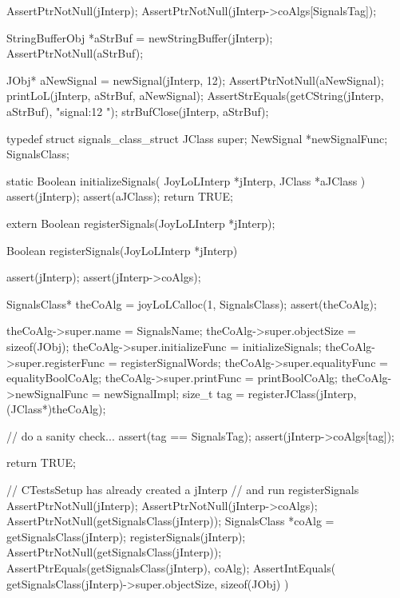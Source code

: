 \startCTest
  AssertPtrNotNull(jInterp);
  AssertPtrNotNull(jInterp->coAlgs[SignalsTag]);

  StringBufferObj *aStrBuf = newStringBuffer(jInterp);
  AssertPtrNotNull(aStrBuf);
  
  JObj* aNewSignal = newSignal(jInterp, 12);
  AssertPtrNotNull(aNewSignal);
  printLoL(jInterp, aStrBuf, aNewSignal);
  AssertStrEquals(getCString(jInterp, aStrBuf), "signal:12 ");
  strBufClose(jInterp, aStrBuf);
\stopCTest
\stopTestCase
\stopTestSuite

\startTestSuite[registerSignals]

\startCHeader
typedef struct signals_class_struct {
  JClass     super;
  NewSignal *newSignalFunc;
} SignalsClass;

\stopCHeader

\startCCode
static Boolean initializeSignals(
  JoyLoLInterp *jInterp,
  JClass       *aJClass
) {
  assert(jInterp);
  assert(aJClass);
  return TRUE;
}
\stopCCode

\startCHeader
extern Boolean registerSignals(JoyLoLInterp *jInterp);
\stopCHeader
{}

\startCCode
Boolean registerSignals(JoyLoLInterp *jInterp) {
  assert(jInterp);
  assert(jInterp->coAlgs);
  
  SignalsClass* theCoAlg
    = joyLoLCalloc(1, SignalsClass);
  assert(theCoAlg);
  
  theCoAlg->super.name           = SignalsName;
  theCoAlg->super.objectSize     = sizeof(JObj);
  theCoAlg->super.initializeFunc = initializeSignals;
  theCoAlg->super.registerFunc   = registerSignalWords;
  theCoAlg->super.equalityFunc   = equalityBoolCoAlg;
  theCoAlg->super.printFunc      = printBoolCoAlg;
  theCoAlg->newSignalFunc        = newSignalImpl;
  size_t tag =
    registerJClass(jInterp, (JClass*)theCoAlg);
  
  // do a sanity check...
  assert(tag == SignalsTag);
  assert(jInterp->coAlgs[tag]);
   
  return TRUE;
}
\stopCCode


\startCTest
  // CTestsSetup has already created a jInterp
  // and run registerSignals
  AssertPtrNotNull(jInterp);
  AssertPtrNotNull(jInterp->coAlgs);
  AssertPtrNotNull(getSignalsClass(jInterp));
  SignalsClass *coAlg = getSignalsClass(jInterp);
  registerSignals(jInterp);
  AssertPtrNotNull(getSignalsClass(jInterp));
  AssertPtrEquals(getSignalsClass(jInterp), coAlg);
  AssertIntEquals(
    getSignalsClass(jInterp)->super.objectSize,
    sizeof(JObj)
  )
\stopCTest
\stopTestCase
\stopTestSuite
